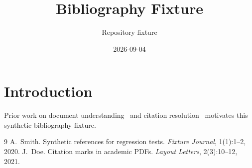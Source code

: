 \documentclass[11pt,a4paper]{article}
\title{Bibliography Fixture}
\author{Repository fixture}
\date{2026-09-04}%
\begin{document}
\maketitle

\section{Introduction}
Prior work on document understanding~\cite{smith2020docs} and citation
resolution~\cite{doe2021refs} motivates this synthetic bibliography fixture.

\begin{thebibliography}{9}
  A.~Smith.
  Synthetic references for regression tests.
  \emph{Fixture Journal}, 1(1):1--2, 2020.
  J.~Doe.
  Citation marks in academic PDFs.
  \emph{Layout Letters}, 2(3):10--12, 2021.
\end{thebibliography}
\end{document}

